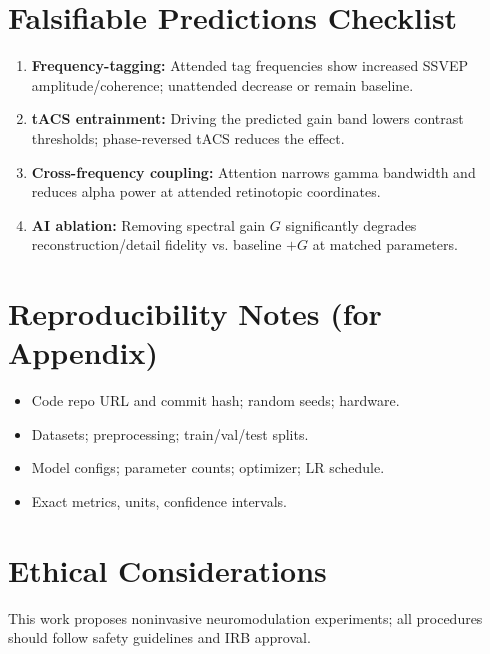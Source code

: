 \documentclass[12pt]{article}
\begin{document}
\section*{Falsifiable Predictions Checklist}
\begin{enumerate}[leftmargin=*]
  \item \textbf{Frequency-tagging:} Attended tag frequencies show increased SSVEP amplitude/coherence; unattended decrease or remain baseline.
  \item \textbf{tACS entrainment:} Driving the predicted gain band lowers contrast thresholds; phase-reversed tACS reduces the effect.
  \item \textbf{Cross-frequency coupling:} Attention narrows gamma bandwidth and reduces alpha power at attended retinotopic coordinates.
  \item \textbf{AI ablation:} Removing spectral gain $G$ significantly degrades reconstruction/detail fidelity vs. baseline $+G$ at matched parameters.
\end{enumerate}

\section*{Reproducibility Notes (for Appendix)}
\begin{itemize}[leftmargin=*]
  \item Code repo URL and commit hash; random seeds; hardware.
  \item Datasets; preprocessing; train/val/test splits.
  \item Model configs; parameter counts; optimizer; LR schedule.
  \item Exact metrics, units, confidence intervals.
\end{itemize}

\section*{Ethical Considerations}
This work proposes noninvasive neuromodulation experiments; all procedures should follow safety guidelines and IRB approval.
\end{document}
